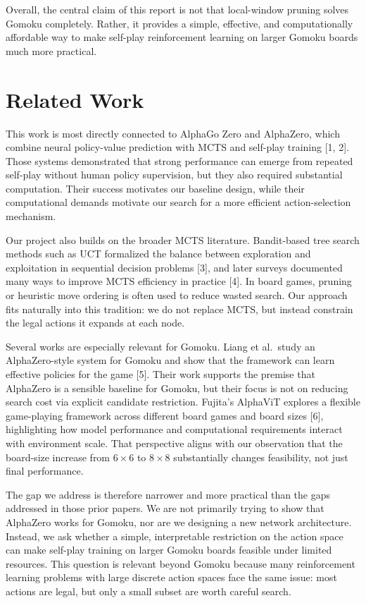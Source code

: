 \documentclass{article}
\begin{document}
Overall, the central claim of this report is not that local-window pruning solves Gomoku completely. Rather, it provides a simple, effective, and computationally affordable way to make self-play reinforcement learning on larger Gomoku boards much more practical.

\section{Related Work}

This work is most directly connected to AlphaGo Zero and AlphaZero, which combine neural policy-value prediction with MCTS and self-play training [1, 2]. Those systems demonstrated that strong performance can emerge from repeated self-play without human policy supervision, but they also required substantial computation. Their success motivates our baseline design, while their computational demands motivate our search for a more efficient action-selection mechanism.

Our project also builds on the broader MCTS literature. Bandit-based tree search methods such as UCT formalized the balance between exploration and exploitation in sequential decision problems [3], and later surveys documented many ways to improve MCTS efficiency in practice [4]. In board games, pruning or heuristic move ordering is often used to reduce wasted search. Our approach fits naturally into this tradition: we do not replace MCTS, but instead constrain the legal actions it expands at each node.

Several works are especially relevant for Gomoku. Liang et al.\ study an AlphaZero-style system for Gomoku and show that the framework can learn effective policies for the game [5]. Their work supports the premise that AlphaZero is a sensible baseline for Gomoku, but their focus is not on reducing search cost via explicit candidate restriction. Fujita's AlphaViT explores a flexible game-playing framework across different board games and board sizes [6], highlighting how model performance and computational requirements interact with environment scale. That perspective aligns with our observation that the board-size increase from \(6 \times 6\) to \(8 \times 8\) substantially changes feasibility, not just final performance.

The gap we address is therefore narrower and more practical than the gaps addressed in those prior papers. We are not primarily trying to show that AlphaZero works for Gomoku, nor are we designing a new network architecture. Instead, we ask whether a simple, interpretable restriction on the action space can make self-play training on larger Gomoku boards feasible under limited resources. This question is relevant beyond Gomoku because many reinforcement learning problems with large discrete action spaces face the same issue: most actions are legal, but only a small subset are worth careful search.
\end{document}
